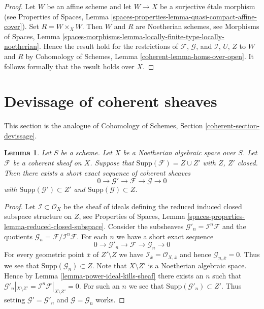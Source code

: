 \documentclass{stacks-project}
\theoremstyle{plain}
\newtheorem{lemma}[subsection]{Lemma}
\theoremstyle{definition}
\theoremstyle{remark}
\numberwithin{equation}{subsection}
\begin{document}
\begin{proof}
Let $W$ be an affine scheme and let $W \to X$ be a surjective \'etale
morphism (see Properties of Spaces, Lemma
\ref{spaces-properties-lemma-quasi-compact-affine-cover}).
Set $R = W \times_X W$. Then $W$ and $R$ are Noetherian schemes, see
Morphisms of Spaces, Lemma
\ref{spaces-morphisms-lemma-locally-finite-type-locally-noetherian}.
Hence the result hold for the restrictions of $\mathcal{F}$, $\mathcal{G}$,
and $\mathcal{I}$, $U$, $Z$ to $W$ and $R$ by
Cohomology of Schemes, Lemma \ref{coherent-lemma-homs-over-open}.
It follows formally that the result holds over $X$.
\end{proof}






\section{Devissage of coherent sheaves}
\label{section-devissage}

\noindent
This section is the analogue of
Cohomology of Schemes, Section \ref{coherent-section-devissage}.

\begin{lemma}
\label{lemma-prepare-filter-support}
Let $S$ be a scheme. Let $X$ be a Noetherian algebraic space over $S$.
Let $\mathcal{F}$ be a coherent sheaf on $X$. Suppose that
$\text{Supp}(\mathcal{F}) = Z \cup Z'$ with $Z$, $Z'$ closed.
Then there exists a short exact sequence of coherent sheaves
$$
0 \to \mathcal{G}' \to \mathcal{F} \to \mathcal{G} \to 0
$$
with $\text{Supp}(\mathcal{G}') \subset Z'$ and
$\text{Supp}(\mathcal{G}) \subset Z$.
\end{lemma}

\begin{proof}
Let $\mathcal{I} \subset \mathcal{O}_X$ be the sheaf of ideals
defining the reduced induced closed subspace structure on $Z$, see
Properties of Spaces, Lemma
\ref{spaces-properties-lemma-reduced-closed-subspace}.
Consider the subsheaves
$\mathcal{G}'_n = \mathcal{I}^n\mathcal{F}$ and the
quotients $\mathcal{G}_n = \mathcal{F}/\mathcal{I}^n\mathcal{F}$.
For each $n$ we have a short exact sequence
$$
0 \to \mathcal{G}'_n \to \mathcal{F} \to \mathcal{G}_n \to 0
$$
For every geometric point $\overline{x}$ of $Z' \setminus Z$ we have
$\mathcal{I}_{\overline{x}} = \mathcal{O}_{X, \overline{x}}$
and hence $\mathcal{G}_{n, \overline{x}} = 0$. Thus we see that
$\text{Supp}(\mathcal{G}_n) \subset Z$. Note that $X \setminus Z'$
is a Noetherian algebraic space. Hence by
Lemma \ref{lemma-power-ideal-kills-sheaf}
there exists an $n$ such that $\mathcal{G}'_n|_{X \setminus Z'} =
\mathcal{I}^n\mathcal{F}|_{X \setminus Z'} = 0$.
For such an $n$ we see that $\text{Supp}(\mathcal{G}'_n) \subset Z'$.
Thus setting $\mathcal{G}' = \mathcal{G}'_n$ and $\mathcal{G} = \mathcal{G}_n$
works.
\end{proof}
\end{document}
